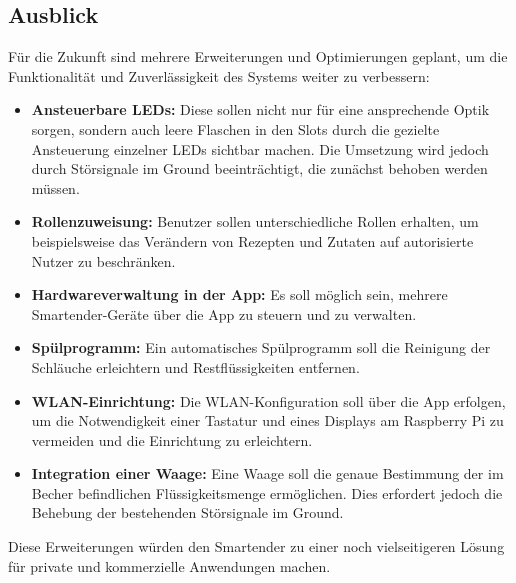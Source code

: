 \subsection{Ausblick}
Für die Zukunft sind mehrere Erweiterungen und Optimierungen geplant, um die Funktionalität und 
Zuverlässigkeit des Systems weiter zu verbessern:

\begin{itemize}
    \item \textbf{Ansteuerbare LEDs:} Diese sollen nicht nur für eine ansprechende Optik sorgen, sondern
    auch leere Flaschen in den Slots durch die gezielte Ansteuerung einzelner LEDs sichtbar machen. Die Umsetzung wird jedoch durch Störsignale im Ground beeinträchtigt, die zunächst behoben werden müssen.
    \item \textbf{Rollenzuweisung:} Benutzer sollen unterschiedliche Rollen erhalten, um 
        beispielsweise das Verändern von Rezepten und Zutaten auf autorisierte Nutzer zu beschränken.
    \item \textbf{Hardwareverwaltung in der App:} Es soll möglich sein, mehrere Smartender-Geräte 
        über die App zu steuern und zu verwalten.
    \item \textbf{Spülprogramm:} Ein automatisches Spülprogramm soll die Reinigung der Schläuche 
        erleichtern und Restflüssigkeiten entfernen.
    \item \textbf{WLAN-Einrichtung:} Die WLAN-Konfiguration soll über die App erfolgen, um die 
        Notwendigkeit einer Tastatur und eines Displays am Raspberry Pi zu vermeiden und die 
        Einrichtung zu erleichtern.
    \item \textbf{Integration einer Waage:} Eine Waage soll die genaue Bestimmung der im Becher 
        befindlichen Flüssigkeitsmenge ermöglichen. Dies erfordert jedoch die Behebung der 
        bestehenden Störsignale im Ground.
\end{itemize}
Diese Erweiterungen würden den Smartender zu einer noch vielseitigeren Lösung für private und 
kommerzielle Anwendungen machen.